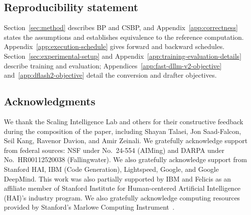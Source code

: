 
\subsection*{Reproducibility statement}
Section~\ref{sec:method} describes BP and CSBP, and
Appendix~\ref{app:correctness} states the assumptions and establishes
equivalence to the reference computation.
Appendix~\ref{app:execution-schedule} gives forward and backward schedules.
Section~\ref{sec:experimental-setup} and
Appendix~\ref{app:training-evaluation-details} describe training and evaluation;
Appendices~\ref{app:fast-dllm-v2-objective} and~\ref{app:dflash2-objective}
detail the conversion and drafter objectives.

\subsection*{Acknowledgments}
We thank the Scaling Intelligence Lab and others for their constructive
feedback during the composition of the paper, including Shayan Talaei, Jon
Saad-Falcon, Seil Kang, Ravenor Davion, and Amir Zeinali. We gratefully
acknowledge support from federal sources: NSF under No.~24-554 (AIMing) and
DARPA under No.~HR00112520038 (Fallingwater). We also gratefully acknowledge
support from Stanford HAI, IBM (Code Generation), Lightspeed, Google, and
Google DeepMind. This work was also partially supported by IBM and Felicis as
an affiliate member of Stanford Institute for Human-centered Artificial
Intelligence (HAI)'s industry program. We also gratefully acknowledge computing
resources provided by Stanford's Marlowe Computing
Instrument~\citep{kapfer2025marlowe}.
